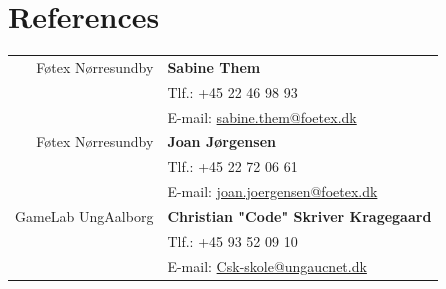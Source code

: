 \documentclass{article}
\begin{document}
    \section*{References}
    \begin{tabular}{r|p{.82\linewidth}}
        Føtex Nørresundby & \textbf{Sabine Them}                                    \\
        &Tlf.: +45 22 46 98 93                                                      \\
        &E-mail: \href{mailto:sabine.them@foetex.dk}{sabine.them@foetex.dk}         \\[.3cm]
        Føtex Nørresundby & \textbf{Joan Jørgensen}                                 \\
        &Tlf.: +45 22 72 06 61                                                      \\
        &E-mail: \href{mailto:joan.joergensen@foetex.dk}{joan.joergensen@foetex.dk} \\[.3cm]
        GameLab UngAalborg & \textbf{Christian "Code" Skriver Kragegaard}           \\
        &Tlf.: +45 93 52 09 10                                                      \\
        &E-mail: \href{mailto:Csk-skole@ungaucnet.dk}{Csk-skole@ungaucnet.dk}       \\
    \end{tabular}
\end{document}
